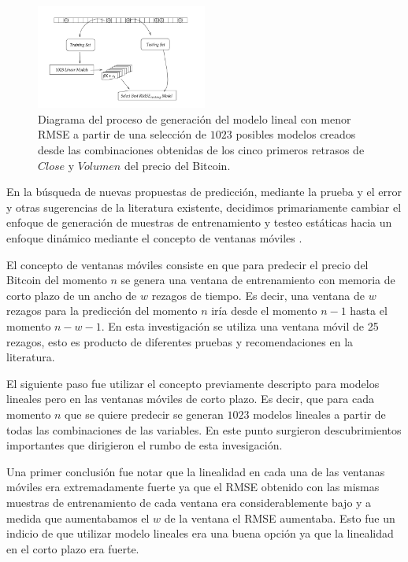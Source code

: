 \documentclass[a4paper,12pt,twocolumn]{article}
\begin{document}
\begin{figure}[!hbt]
\centering
\includegraphics[width=0.5\textwidth]{diagramLinearRegression}
\caption{Diagrama del proceso de generación del modelo lineal con menor RMSE a partir de una selección de $1023$ posibles modelos creados desde las combinaciones obtenidas de los cinco primeros retrasos de $Close$ y $Volumen$ del precio del Bitcoin.}
\label{diagramLinearRegression}
\end{figure}

En la búsqueda de nuevas propuestas de predicción, mediante la prueba y el error y otras sugerencias de la literatura existente, decidimos primariamente cambiar el enfoque de generación de muestras de entrenamiento y testeo estáticas hacia un enfoque dinámico mediante el concepto de ventanas móviles \cite{forecastinBitcoinClosing}. 

El concepto de ventanas móviles consiste en que para predecir el precio del Bitcoin del momento $n$ se genera una ventana de entrenamiento con memoria de corto plazo de un ancho de $w$ rezagos de tiempo. Es decir, una ventana de $w$ rezagos para la predicción del momento $n$ iría desde el momento $n-1$ hasta el momento $n-w-1$. En esta investigación se utiliza una ventana móvil de 25 rezagos, esto es producto de diferentes pruebas y recomendaciones en la literatura. 

El siguiente paso fue utilizar el concepto previamente descripto para modelos lineales pero en las ventanas móviles de corto plazo. Es decir, que para cada momento $n$ que se quiere predecir se generan $1023$ modelos lineales a partir de todas las combinaciones de las variables. En este punto surgieron descubrimientos importantes que dirigieron el rumbo de esta invesigación. 

Una primer conclusión fue notar que la linealidad en cada una de las ventanas móviles era extremadamente fuerte ya que el RMSE obtenido con las mismas muestras de entrenamiento de cada ventana era considerablemente bajo y a medida que aumentabamos el $w$ de la ventana el RMSE aumentaba. Esto fue un indicio de que utilizar modelo lineales era una buena opción ya que la linealidad en el corto plazo era fuerte.
\end{document}
